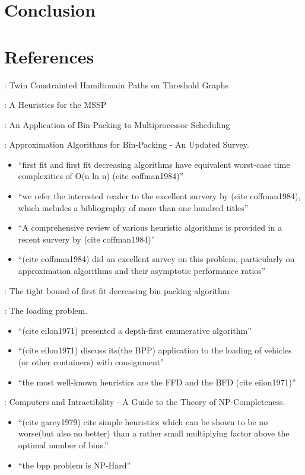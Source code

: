 \documentclass[oribibl]{llncs}
\begin{document}
\section{Conclusion}
\label{sec:conclusion}

\section{References}
\cite{becker2010}: Twin Constrainted Hamiltonain Paths on Threshold Graphs 

\cite{becker2015}: A Heuristics for the MSSP

\cite{coffman1978}: An Application of Bin-Packing to Multiprocessor Scheduling

\cite{coffman1984}: Approximation Algorithms for Bin-Packing - An Updated Survey.
\begin{itemize}
	\item ``first fit and first fit decreasing algorithms have equivalent worst-case time complexities of O(n ln n) (cite coffman1984)''
	\item ``we refer the interested reader to the excellent survery by (cite coffman1984), which includes a bibliography of more than one hundred titles''
	\item ``A comprehensive review of various heuristic algorithms is provided in a recent survery by (cite coffman1984)''
	\item ``(cite coffman1984) did an excellent survey on this problem, particularly on approximation algorithms and their asymptotic performance ratios''
\end{itemize}
\cite{dosa2007}: The tight bound of first fit decreasing bin packing algorithm

\cite{eilon1971}: The loading problem. 
\begin{itemize}
	\item ``(cite eilon1971) presented a depth-first enumerative algorithm''
	\item ``(cite eilon1971) discuss its(the BPP) application to the loading of vehicles (or other containers) with consignment'' 
	\item ``the most well-known heuristics are the FFD and the BFD (cite eilon1971)''
\end{itemize}
\cite{garey1979}: Computers and Intractibility - A Guide to the Theory of NP-Completeness. 
\begin{itemize}
	\item ``(cite garey1979) cite simple heuristics which can be shown to be no
	worse(but also no better) than a rather small multiplying factor above the optimal number of bins.''
	\item ``the bpp problem is NP-Hard''
\end{itemize}
\end{document}
